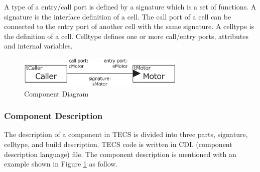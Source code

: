 \documentclass{sig-alternate-05-2015}
\begin{document}
A type of a {\myit entry}/{\myit call} port is defined by a {\myit signature} which is a set of functions.
A {\myit signature} is the interface definition of a {\myit cell}.
The {\myit call} port of a {\myit cell} can be connected to the {\myit entry} port of another {\myit cell} with the same {\myit signature}.
A {\myit celltype} is the definition of a {\myit cell}.
{\myit Celltype} defines one or more {\myit call}/{\myit entry} ports, attributes and internal variables.

\begin{figure}[t]
    \centering
    \includegraphics[width=8cm,clip]{figure/component_diagram.eps}
    \vspace{1mm}
    \caption{Component Diagram}
    \vspace{1mm}
    \label{fig:component}
\end{figure}

\subsubsection{Component Description}
The description of a component in TECS is divided into three parts, {\myit signature}, {\myit celltype}, and build description.
TECS code is written in CDL (component description language) file.
The component description is mentioned with an example shown in Figure \ref{fig:component} as follow.
\end{document}
